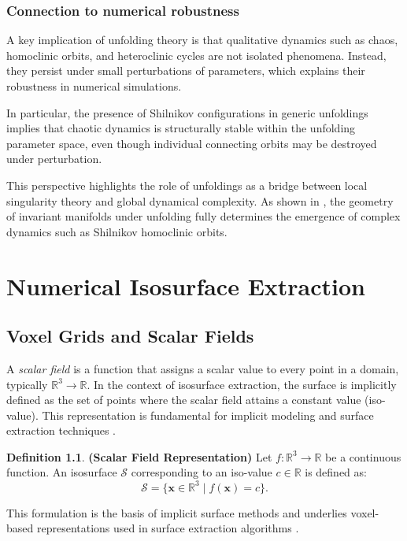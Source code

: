 \documentclass[12pt, a4paper, oneside]{book}
\theoremstyle{plain}
\theoremstyle{definition}
\newtheorem{definition}[theorem]{Definition}
\theoremstyle{remark}
\theoremstyle{definition}
\begin{document}
\subsection{Connection to numerical robustness}

A key implication of unfolding theory is that qualitative dynamics such as chaos, homoclinic orbits, and heteroclinic cycles are not isolated phenomena. Instead, they persist under small perturbations of parameters, which explains their robustness in numerical simulations.

In particular, the presence of Shilnikov configurations in generic unfoldings implies that chaotic dynamics is structurally stable within the unfolding parameter space, even though individual connecting orbits may be destroyed under perturbation.

This perspective highlights the role of unfoldings as a bridge between local singularity theory and global dynamical complexity. As shown in \cite{ibanez2005shil}, the geometry of invariant manifolds under unfolding fully determines the emergence of complex dynamics such as Shilnikov homoclinic orbits.

\chapter{Numerical Isosurface Extraction}
\section{Voxel Grids and Scalar Fields}

A \emph{scalar field} is a function that assigns a scalar value to every point in a domain, typically $\mathbb{R}^3 \rightarrow \mathbb{R}$. In the context of isosurface extraction, the surface is implicitly defined as the set of points where the scalar field attains a constant value (iso-value). This representation is fundamental for implicit modeling and surface extraction techniques \cite{bloomenthal1997introduction}.

\begin{definition}
    \textbf{ (Scalar Field Representation)}
Let $f:\mathbb{R}^3 \rightarrow \mathbb{R}$ be a continuous function. An isosurface $\mathcal{S}$ corresponding to an iso-value $c \in \mathbb{R}$ is defined as:
\[
\mathcal{S} = \{ \mathbf{x} \in \mathbb{R}^3 \mid f(\mathbf{x}) = c \}.
\]
\end{definition}

This formulation is the basis of implicit surface methods and underlies voxel-based representations used in surface extraction algorithms \cite{bloomenthal1997introduction,lorensen1998marching}.
\end{document}
